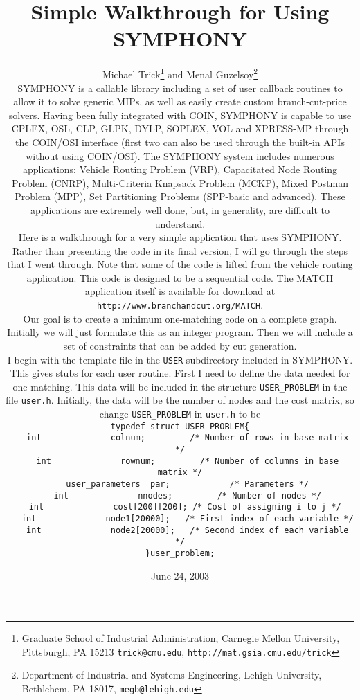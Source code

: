 \documentclass[11pt]{article}
\begin{document}
\title{Simple Walkthrough for Using SYMPHONY} \author{Michael
Trick\thanks{Graduate School of Industrial Administration, Carnegie Mellon
University, Pittsburgh, PA 15213 \texttt{trick@cmu.edu},
\texttt{http://mat.gsia.cmu.edu/trick}} and Menal Guzelsoy\thanks{Department
of Industrial and Systems Engineering, Lehigh University, Bethlehem, PA 18017,
{\tt megb@lehigh.edu}}

\date{June 24, 2003}
\maketitle
\thispagestyle{empty}

SYMPHONY is a callable library including a set of user callback routines to
allow it to solve generic MIPs, as well as easily create custom
branch-cut-price solvers. Having been fully integrated with COIN, SYMPHONY is
capable to use CPLEX, OSL, CLP, GLPK, DYLP, SOPLEX, VOL and XPRESS-MP through
the COIN/OSI interface (first two can also be used through the built-in APIs
without using COIN/OSI). The SYMPHONY system includes numerous applications:
Vehicle Routing Problem (VRP), Capacitated Node Routing Problem (CNRP),
Multi-Criteria Knapsack Problem (MCKP), Mixed Postman Problem (MPP), Set
Partitioning Problems (SPP-basic and advanced).  These applications are
extremely well done, but, in generality, are difficult to understand.

Here is a walkthrough for a very simple application that uses SYMPHONY. Rather
than presenting the code in its final version, I will go through the steps 
that I went through. Note that some of the code is lifted from the vehicle 
routing application. This code is designed to be a sequential code. The MATCH application itself is available for download at 
\texttt{http://www.branchandcut.org/MATCH}. 

Our goal is to create a minimum one-matching code on a complete graph.
Initially we will just formulate this as an integer program. Then we will
include a set of constraints that can be added by cut generation.

I begin with the template file in the \texttt{USER} subdirectory included in
SYMPHONY. This gives stubs for each user routine. First I need to define the
data needed for one-matching. This data will be included in the structure
\texttt{USER\_PROBLEM} in the file \texttt{user.h}.  Initially, the data will
be the number of nodes and the cost matrix, so change \texttt{USER\_PROBLEM}
in \texttt{user.h} to be
\begin{verbatim}
typedef struct USER_PROBLEM{
   int              colnum;         /* Number of rows in base matrix */
   int              rownum;         /* Number of columns in base matrix */
   user_parameters  par;            /* Parameters */
   int              nnodes;         /* Number of nodes */
   int              cost[200][200]; /* Cost of assigning i to j */ 
   int              node1[20000];   /* First index of each variable */
   int              node2[20000];   /* Second index of each variable */
}user_problem;
\end{verbatim}

}
\end{document}
